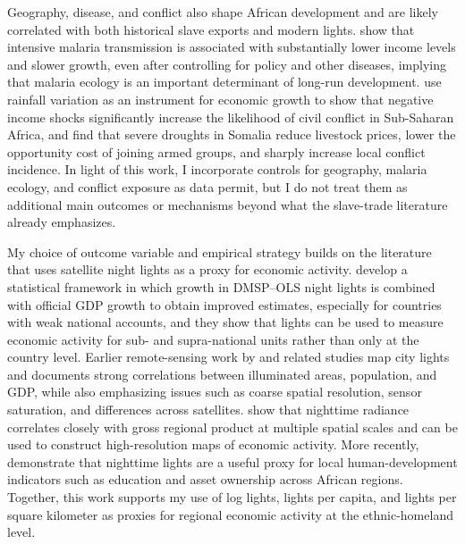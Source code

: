\documentclass[12pt]{article}
\begin{document}
Geography, disease, and conflict also shape African development and are likely correlated with both historical slave exports and modern lights. \citet{gallupsachs2001} show that intensive malaria transmission is associated with substantially lower income levels and slower growth, even after controlling for policy and other diseases, implying that malaria ecology is an important determinant of long-run development. \citet{miguel2004} use rainfall variation as an instrument for economic growth to show that negative income shocks significantly increase the likelihood of civil conflict in Sub-Saharan Africa, and \citet{maystadtecker2014} find that severe droughts in Somalia reduce livestock prices, lower the opportunity cost of joining armed groups, and sharply increase local conflict incidence. In light of this work, I incorporate controls for geography, malaria ecology, and conflict exposure as data permit, but I do not treat them as additional main outcomes or mechanisms beyond what the slave-trade literature already emphasizes.

My choice of outcome variable and empirical strategy builds on the literature that uses satellite night lights as a proxy for economic activity. \citet{henderson2012} develop a statistical framework in which growth in DMSP--OLS night lights is combined with official GDP growth to obtain improved estimates, especially for countries with weak national accounts, and they show that lights can be used to measure economic activity for sub- and supra-national units rather than only at the country level. Earlier remote-sensing work by \citet{elvidge1997} and related studies map city lights and documents strong correlations between illuminated areas, population, and GDP, while also emphasizing issues such as coarse spatial resolution, sensor saturation, and differences across satellites. \citet{doll2006} show that nighttime radiance correlates closely with gross regional product at multiple spatial scales and can be used to construct high-resolution maps of economic activity. More recently, \citet{bruederlehodler2018} demonstrate that nighttime lights are a useful proxy for local human-development indicators such as education and asset ownership across African regions. Together, this work supports my use of log lights, lights per capita, and lights per square kilometer as proxies for regional economic activity at the ethnic-homeland level.
\end{document}
